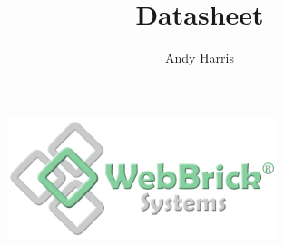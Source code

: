 \documentclass[a4paper,12pt]{article}
\title{\sf{WebBrick Gateway}\linebreak \linebreak Datasheet}
\author{Andy Harris}
\begin{document}
\maketitle

\begin{figure}[H]
\centering
\includegraphics[width=0.7\textwidth]{../../Images/WebBrickSystems.png}
\end{figure}










\end{document}
